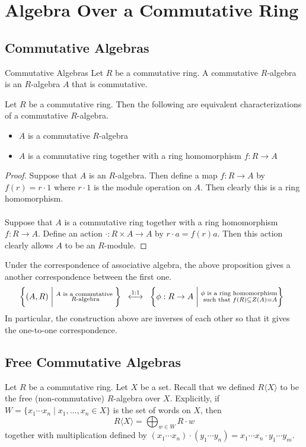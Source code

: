 \documentclass[a4paper]{article}
\begin{document}
\pagebreak
\section{Algebra Over a Commutative Ring}
\subsection{Commutative Algebras}
\begin{defn}{Commutative Algebras}{} Let $R$ be a commutative ring. A commutative $R$-algebra is an $R$-algebra $A$ that is commutative. 
\end{defn}

\begin{prp}{}{} Let $R$ be a commutative ring. Then the following are equivalent characterizations of a commutative $R$-algebra. 
\begin{itemize}
\item $A$ is a commutative $R$-algebra
\item $A$ is a commutative ring together with a ring homomorphism $f:R\to A$
\end{itemize}\tcbline
\begin{proof}
Suppose that $A$ is an $R$-algebra. Then define a map $f:R\to A$ by $f(r)=r\cdot 1$ where $r\cdot 1$ is the module operation on $A$. Then clearly this is a ring homomorphism. \\~\\
Suppose that $A$ is a commutative ring together with a ring homomorphism $f:R\to A$. Define an action $\cdot:R\times A\to A$ by $r\cdot a=f(r)a$. Then this action clearly allows $A$ to be an $R$-module. 
\end{proof}
\end{prp}

Under the correspondence of associative algebra, the above proposition gives a another correspondence between the first one. $$\left\{(A,R)\;\bigg{|}\;\substack{A\text{ is a commutative }\\R\text{-algebra}}\right\}\;\;\overset{1:1}{\longleftrightarrow}\;\;\left\{\phi:R\to A\;\bigg{|}\;\substack{\phi\text{ is a ring homomorphism}\\\text{ such that }f(R)\subseteq Z(A)=A}\right\}\;\;$$ In particular, the construction above are inverses of each other so that it gives the one-to-one correspondence. 

\subsection{Free Commutative Algebras}
Let $R$ be a commutative ring. Let $X$ be a set. Recall that we defined $R\langle X\rangle$ to be the free (non-commutative) $R$-algebra over $X$. Explicitly, if $W=\{x_1\cdots x_n\;|\;x_1,\dots,x_n\in X\}$ is the set of words on $X$, then $$R\langle X\rangle=\bigoplus_{w\in W}R\cdot w$$ together with multiplication defined by $(x_1\cdots x_n)\cdot(y_1\cdots y_n)=x_1\cdots x_n\cdot y_1\cdots y_m$. 
\end{document}
